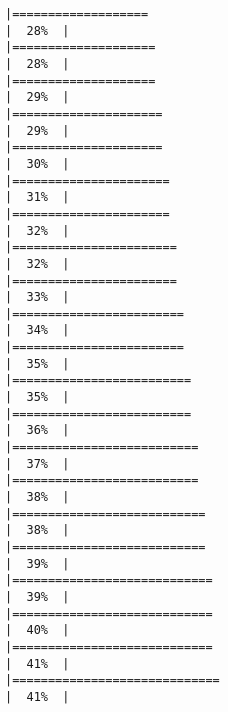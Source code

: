 \documentclass[
]{book}
\begin{document}
\begin{verbatim}
|===================                                                   |  28%  |                                                                              |====================                                                  |  28%  |                                                                              |====================                                                  |  29%  |                                                                              |=====================                                                 |  29%  |                                                                              |=====================                                                 |  30%  |                                                                              |======================                                                |  31%  |                                                                              |======================                                                |  32%  |                                                                              |=======================                                               |  32%  |                                                                              |=======================                                               |  33%  |                                                                              |========================                                              |  34%  |                                                                              |========================                                              |  35%  |                                                                              |=========================                                             |  35%  |                                                                              |=========================                                             |  36%  |                                                                              |==========================                                            |  37%  |                                                                              |==========================                                            |  38%  |                                                                              |===========================                                           |  38%  |                                                                              |===========================                                           |  39%  |                                                                              |============================                                          |  39%  |                                                                              |============================                                          |  40%  |                                                                              |============================                                          |  41%  |                                                                              |=============================                                         |  41%  |                                                                              
\end{verbatim}
\end{document}
